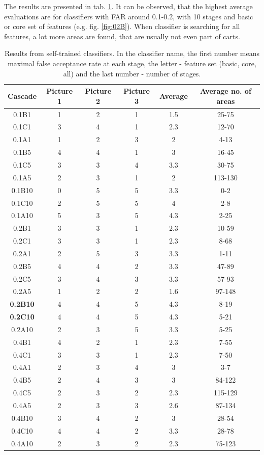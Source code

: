 \documentclass[hyperref]{acmtrans2e}
\begin{document}
The results are presented in tab. \ref{tab:trained}. It can be observed, that the highest average evaluations are for classifiers with FAR around 0.1-0.2, with 10 stages and basic or core set of features (e.g. fig. \ref{fig:02B}). When classifier is searching for all features, a lot more areas are found, that are usually not even part of carts.
\begin{table}
\centering
\begin{tabular}{| c | c | c | c | c | c |}
   \hline
   Cascade & Picture 1 & Picture 2 & Picture 3 & Average & Average no. of areas  \\ \hline
   0.1B1 & 1 & 2 & 1 & 1.5 	& 25-75 \\ \hline
   0.1C1 & 3 & 4 & 1 & 2.3 	& 12-70 \\  \hline
   0.1A1 & 1 & 2 & 3 & 2 	& 4-13 \\  \hline
   0.1B5 & 4 & 4 & 1 & 3	& 16-45 \\ \hline
   0.1C5 & 3 & 3 & 4 & 3.3	& 30-75 \\  \hline
   0.1A5 & 2 & 3 & 1 & 2	& 113-130 \\  \hline
   0.1B10 & 0 & 5 & 5 & 3.3	& 0-2 \\ \hline
   0.1C10 & 2 & 5 & 5 & 4	& 2-8 \\  \hline
   0.1A10 & 5 & 3 & 5 & 4.3	& 2-25 \\  \hline
   0.2B1 & 3 & 3 & 1 & 2.3	& 10-59 \\ \hline
   0.2C1 & 3 & 3 & 1 & 2.3	& 8-68 \\  \hline
   0.2A1 & 2 & 5 & 3 & 3.3	& 1-11 \\  \hline
   0.2B5 & 4 & 4 & 2 & 3.3	& 47-89 \\ \hline
   0.2C5 & 3 & 4 & 3 & 3.3	& 57-93 \\  \hline
   0.2A5 & 1 & 2 & 2 & 1.6	& 97-148 \\  \hline
  \textbf{ 0.2B10} & 4 & 4 & 5 & 4.3	& 8-19 \\ \hline
   \textbf{0.2C10} & 4 & 4 & 5 & 4.3	& 5-21 \\  \hline
   0.2A10 & 2 & 3 & 5 & 3.3	& 5-25 \\  \hline
   0.4B1 & 4 & 2 & 1 & 2.3	& 7-55 \\ \hline
   0.4C1 & 3 & 3 & 1 & 2.3	& 7-50 \\  \hline
   0.4A1 & 2 & 3 & 4 & 3	& 3-7 \\  \hline
   0.4B5 & 2 & 4 & 3 & 3	& 84-122 \\ \hline
   0.4C5 & 2 & 3 & 2 & 2.3	& 115-129 \\  \hline
   0.4A5 & 2 & 3 & 3 & 	2.6	& 87-134 \\  \hline
   0.4B10 & 3 & 4 & 2 & 3	& 28-54 \\ \hline
   0.4C10 & 4 & 4 & 2 &	3.3	& 28-78 \\  \hline
   0.4A10 & 2 & 3 & 2 & 2.3	& 75-123 \\  \hline
   
\end{tabular}
\caption{Results from self-trained classifiers. In the classifier name, the first number means maximal false acceptance rate at each stage, the letter - feature set (basic, core, all) and the last number - number of stages.}
\label{tab:trained}
\end{table}
\end{document}
